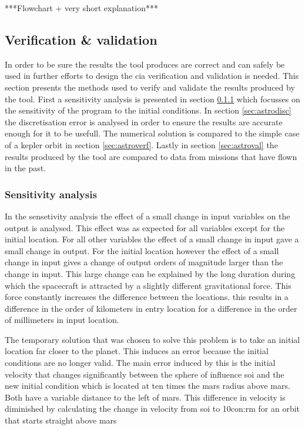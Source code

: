 ***Flowchart + very short explanation***\\

\subsection{Verification \& validation}
\label{sec:astrovv}

In order to be sure the results the tool produces are correct and can safely be used in further efforts to design the \gls{cia} verification and validation is needed. This section presents the methods used to verify and validate the results produced by the tool. First a sensitivity analysis is presented in section \ref{sec:astrosens} which focusses on the sensitivity of the program to the initial conditions. In section \ref{sec:astrodisc} the discretisation error is analysed in order to ensure the results are accurate enough for it to be usefull. The numerical solution is compared to the simple case of a kepler orbit in section \ref{sec:astroverf}. Lastly in section \ref{sec:astroval} the results produced by the tool are compared to data from missions that have flown in the past.

\subsubsection{Sensitivity analysis}
\label{sec:astrosens}

In the sensetivity analysis the effect of a small change in input variables on the output is analysed. This effect was as expected for all variables except for the initial location. For all other variables the effect of a small change in input gave a small change in output. For the initial location however the effect of a small change in input gives a change of output orders of magnitude larger than the change in input. This large change can be explained by the long duration during which the spacecraft is attracted by a slightly different gravitational force. This force constantly increases the difference between the locations. this results in a difference in the order of kilometers in entry location for a difference in the order of millimeters in input location.

The temporary solution that was chosen to solve this problem is to take an initial location far closer to the planet. This induces an error because the initial conditions are no longer valid. The main error induced by this is the initial velocity that changes significantly between the sphere of influence \gls{soi} and the new initial condition which is located at ten times the mars radius above mars. Both have a variable distance to the left of mars. This difference in velocity is diminished by calculating the change in velocity from \gls{soi} to 10\gls{con:rm} for an orbit that starts straight above mars

